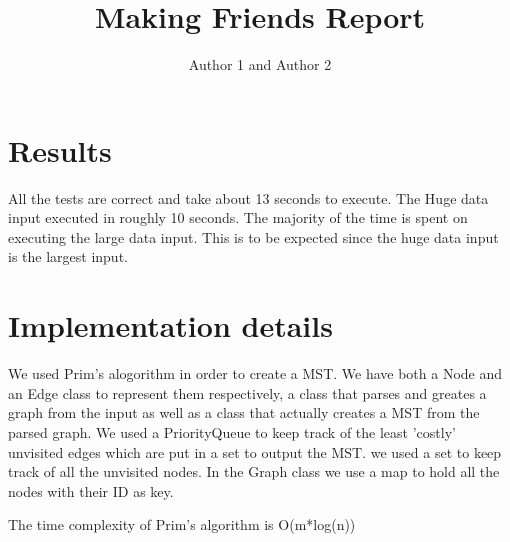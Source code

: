 \documentclass{article}
\title{Making Friends Report}
\author{Author 1 and Author 2}
\begin{document}
  \maketitle

  \section{Results}

  
  \par
  All the tests are correct and take about 13 seconds to execute. The Huge data input executed in roughly 10 seconds. The majority of the time is spent on executing the large data input. This is to be expected since the huge data input is the largest input.

  \section{Implementation details}

  
  \par
  We used Prim's alogorithm in order to create a MST. We have both a Node and  an Edge class to represent them respectively, a class that parses and greates a graph from the input as well as a class that actually creates a MST from the parsed graph. We used a PriorityQueue to keep track of the least 'costly' unvisited edges which are put in a set to output the MST. we used a set to keep track of all the unvisited nodes. In the Graph class we use a map to hold all the nodes with their ID as key.
  
  \par  
  The time complexity of Prim's algorithm is O(m*log(n))
\end{document}
